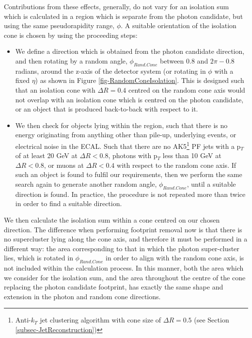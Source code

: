 Contributions from these effects, generally, do not vary for an isolation sum which is calculated in a region which is separate from the photon candidate, but using the same pseudorapidity range, $\phi$. A suitable orientation of the isolation cone is chosen by using the proceeding steps:

\begin{itemize}
	\item We define a direction which is obtained from the photon candidate direction, and then rotating by a random angle, $\phi_{Rand.Cone}$ between $0.8$ and $2\pi - 0.8$ radians, around the z-axis of the detector system (or rotating in $\phi$ with a fixed $\eta$) as shown in Figure \ref{fig-RandomConeIsolation}. This is designed such that an isolation cone with $\Delta R = 0.4$ centred on the random cone axis would not overlap with an isolation cone which is centred on the photon candidate, or an object that is produced back-to-back with respect to it.
	\item We then check for objects lying within the region, such that there is no energy originating from anything other than pile-up, underlying events, or electrical noise in the ECAL. Such that there are no AK5\footnote{Anti-$k_T$ jet clustering algorithm with cone size of $\Delta R = 0.5$ (see Section \ref{subsec-JetReconstruction})} PF jets with a p$_T$ of at least 20 GeV at $\Delta R < 0.8$, photons with p$_T$ less than 10 GeV at $\Delta R < 0.8$, or muons at $\Delta R < 0.4$ with respect to the random cone axis. If such an object is found to fulfil our requirements, then we perform the same search again to generate another random angle, $\phi_{Rand.Cone}$, until a suitable direction is found. In practice, the procedure is not repeated more than twice in order to find a suitable direction.   
\end{itemize}

We then calculate the isolation sum within a cone centred on our chosen direction. The difference when performing footprint removal now is that there is no supercluster lying along the cone axis, and therefore it must be performed in a different way: the area corresponding to that in which the photon super-cluster lies, which is rotated in $\phi_{Rand.Cone}$ in order to align with the random cone axis, is not included within the calculation process. In this manner, both the area which we consider for the isolation sum, and the area throughout the centre of the cone replacing the photon candidate footprint, has exactly the same shape and extension in the photon and random cone directions.   

